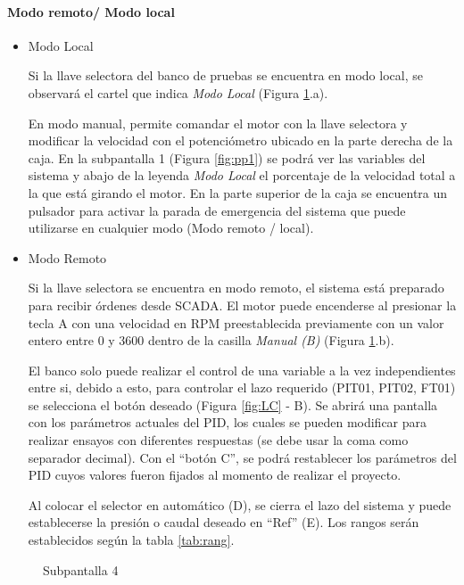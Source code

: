 \paragraph{Modo remoto/ Modo local}
\begin{itemize}
	\item Modo Local
	
	Si la llave selectora del banco de pruebas se encuentra en modo local, se observará el cartel que indica \textit{Modo Local} (Figura \ref{fig:localremoto}.a).
	
	En modo manual, permite comandar el motor con la llave selectora y modificar la velocidad con el potenciómetro ubicado en la parte derecha de la caja. En la subpantalla 1 (Figura \ref{fig:pp1}) se podrá ver las variables del sistema y abajo de la leyenda\textit{ Modo Local} el porcentaje de la velocidad total a la que está girando el motor. En la parte superior de la caja se encuentra un pulsador para activar la parada de emergencia del sistema que puede utilizarse en cualquier modo (Modo remoto / local). 
	
	\item Modo Remoto
	
	Si la llave selectora se encuentra en modo remoto, el sistema está preparado para recibir órdenes desde SCADA. El motor puede encenderse al presionar la tecla A con una velocidad en RPM preestablecida previamente con un valor entero entre 0 y 3600 dentro de la casilla \textit{Manual (B)}  (Figura \ref{fig:localremoto}.b). 
	
	El banco solo puede realizar el control de una variable a la vez independientes entre si, debido a esto, para controlar el lazo requerido (PIT01, PIT02, FT01) se selecciona el botón deseado (Figura \ref{fig:LC} - B). Se abrirá una pantalla con los parámetros actuales del PID, los cuales se pueden modificar para realizar ensayos con diferentes respuestas (se debe usar la coma como separador decimal). Con el ``botón C'', se podrá restablecer los parámetros del PID cuyos valores fueron fijados al momento de realizar el proyecto.
			
	Al colocar el selector en automático (D), se cierra el lazo del sistema y puede establecerse la presión o caudal deseado en ``Ref'' (E). Los rangos serán establecidos según la tabla \ref{tab:rang}. 
\end{itemize}

\begin{figure}[h!]
	\centering
	\caption{Subpantalla 4} \label{fig:localremoto}
\end{figure}


